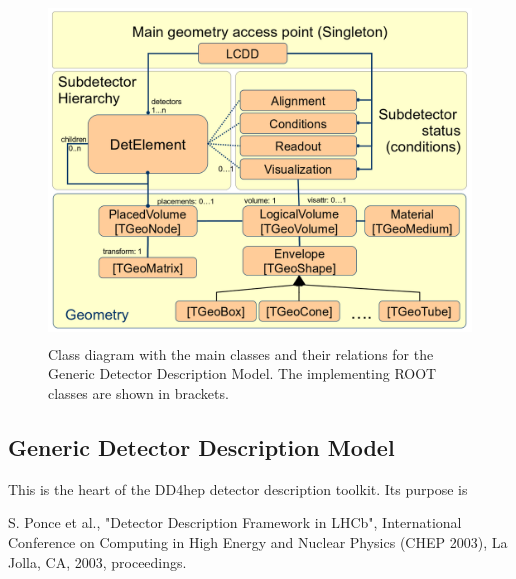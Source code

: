 \documentclass[10pt,a4paper]{article}
\begin{document}
\begin{figure}[h]
  \begin{center}
    \includegraphics[height=90mm] {DD4hep_classes.png}
    \caption{Class diagram with the main classes and their relations 
             for the Generic Detector Description Model. The implementing
             ROOT classes are shown in brackets.}
    \label{fig:dd4hep-detector-model}
  \end{center}
\end{figure}
\vspace{-0.5cm}
\subsection{Generic Detector Description Model}
\label{subsec:generic-model}

\noindent
This is the heart of the DD4hep detector description toolkit. Its purpose is 

\newpage
\begin{thebibliography}{9}
 S. Ponce et al., 
                "Detector Description Framework in LHCb", 
                International Conference on Computing in High Energy and Nuclear Physics  (CHEP 2003), 
                La Jolla, CA, 2003, proceedings. 
\end{thebibliography}
\end{document}
